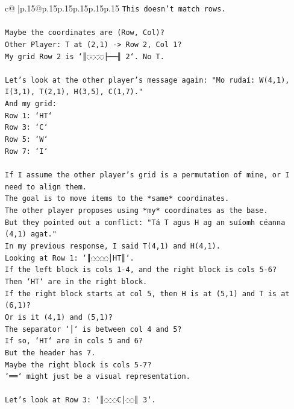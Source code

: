 \documentclass{article}
\begin{document}
{\begin{supertabular}{c@{$\;$}|p{.15\linewidth}@{}p{.15\linewidth}p{.15\linewidth}p{.15\linewidth}p{.15\linewidth}p{.15\linewidth}}
{{{\texttt{This doesn't match rows.} \\
\\ 
\texttt{Maybe the coordinates are (Row, Col)?} \\
\texttt{Other Player: T at (2,1) {-}> Row 2, Col 1?} \\
\texttt{My grid Row 2 is `║◌◌◌◌├──╢ 2`. No T.} \\
\\ 
\texttt{Let's look at the other player's message again: "Mo rudaí: W(4,1), I(3,1), T(2,1), H(3,5), C(1,7)."} \\
\texttt{And my grid:} \\
\texttt{Row 1: `HT`} \\
\texttt{Row 3: `C`} \\
\texttt{Row 5: `W`} \\
\texttt{Row 7: `I`} \\
\\ 
\texttt{If I assume the other player's grid is a permutation of mine, or I need to align them.} \\
\texttt{The goal is to move items to the *same* coordinates.} \\
\texttt{The other player proposes using *my* coordinates as the base.} \\
\texttt{But they pointed out a conflict: "Tá T agus H ag an suíomh céanna (4,1) agat."} \\
\texttt{In my previous response, I said T(4,1) and H(4,1).} \\
\texttt{Looking at Row 1: `║◌◌◌◌│HT║`.} \\
\texttt{If the left block is cols 1{-}4, and the right block is cols 5{-}6?} \\
\texttt{Then `HT` are in the right block.} \\
\texttt{If the right block starts at col 5, then H is at (5,1) and T is at (6,1)?} \\
\texttt{Or is it (4,1) and (5,1)?} \\
\texttt{The separator `│` is between col 4 and 5?} \\
\texttt{If so, `HT` are in cols 5 and 6?} \\
\texttt{But the header has 7.} \\
\texttt{Maybe the right block is cols 5{-}7?} \\
\texttt{`══` might just be a visual representation.} \\
\\ 
\texttt{Let's look at Row 3: `║◌◌◌C│◌◌║ 3`.} \\
}}}
\end{supertabular}}
\end{document}
